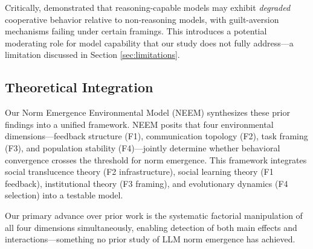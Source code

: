 Critically,  demonstrated that reasoning-capable models may exhibit \emph{degraded} cooperative behavior relative to non-reasoning models, with guilt-aversion mechanisms failing under certain framings. This introduces a potential moderating role for model capability that our study does not fully address—a limitation discussed in Section \ref{sec:limitations}.

\subsection{Theoretical Integration}
\label{sec:theory}

Our Norm Emergence Environmental Model (NEEM) synthesizes these prior findings into a unified framework. NEEM posits that four environmental dimensions—feedback structure (F1), communication topology (F2), task framing (F3), and population stability (F4)—jointly determine whether behavioral convergence crosses the threshold for norm emergence. This framework integrates social translucence theory (F2 infrastructure), social learning theory (F1 feedback), institutional theory (F3 framing), and evolutionary dynamics (F4 selection) into a testable model.

Our primary advance over prior work is the systematic factorial manipulation of all four dimensions simultaneously, enabling detection of both main effects and interactions—something no prior study of LLM norm emergence has achieved.
